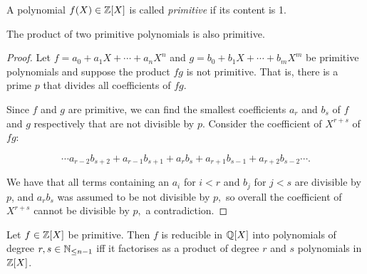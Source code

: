 \begin{definition}
  A polynomial $f(X) \in \mathbb Z[X]$ is called \emph{primitive} if its content is 1.
  \label{def:primitivePol}
\end{definition}
\begin{lemma}
    The product of two primitive polynomials is also primitive.
\end{lemma}
\begin{proof}


    Let $f = a_0 + a_1X + \cdots + a_nX^n$ and $g = b_0 + b_1X + \cdots + b_mX^m$ be primitive polynomials and suppose the product $fg$ is not primitive. That is, there is a prime $p$ that divides all coefficients of $fg.$ 

    Since $f$ and $g$ are primitive, we can find the smallest coefficients $a_r$ and $b_s$ of $f$ and $g$ respectively that are not divisible by $p$. Consider the coefficient of $X^{r+s}$ of $fg$:

    $$
    \cdots a_{r-2}b_{s+2}+a_{r-1}b_{s+1} +a_r b_s +  a_{r+1}b_{s-1}+a_{r+2}b_{s-2}\cdots .
    $$

    We have that all terms containing an $a_i$ for $i<r$ and $b_j$ for $j<s$ are divisible by $p$, and $a_r b_s$ was assumed to be not divisible by $p,$ so overall the coefficient of $X^{r+s}$ cannot be divisible by $p,$ a contradiction.
\end{proof}
\begin{theorem}
  Let $f\in \mathbb Z[X]$ be primitive. Then $f$ is reducible in $\mathbb Q[X]$ into polynomials of
  degree $r,s\in \mathbb N_{\leq n-1}$ iff it factorises as a product of degree $r$ and $s$ polynomials in $\mathbb Z[X]$.
  \label{thm:GaussLemmaPol}
\end{theorem}
